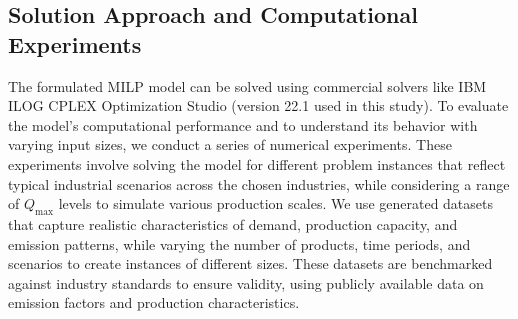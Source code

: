 \documentclass[final,3p,times,review,authoryear]{elsarticle}
\begin{document}
\subsection{Solution Approach and Computational Experiments}
The formulated MILP model can be solved using commercial solvers like IBM ILOG CPLEX Optimization Studio (version 22.1 used in this study). To evaluate the model's computational performance and to understand its behavior with varying input sizes, we conduct a series of numerical experiments. These experiments involve solving the model for different problem instances that reflect typical industrial scenarios across the chosen industries, while considering a range of $Q_{\text{max}}$ levels to simulate various production scales. We use generated datasets that capture realistic characteristics of demand, production capacity, and emission patterns, while varying the number of products, time periods, and scenarios to create instances of different sizes. These datasets are benchmarked against industry standards to ensure validity, using publicly available data on emission factors and production characteristics.
\end{document}
